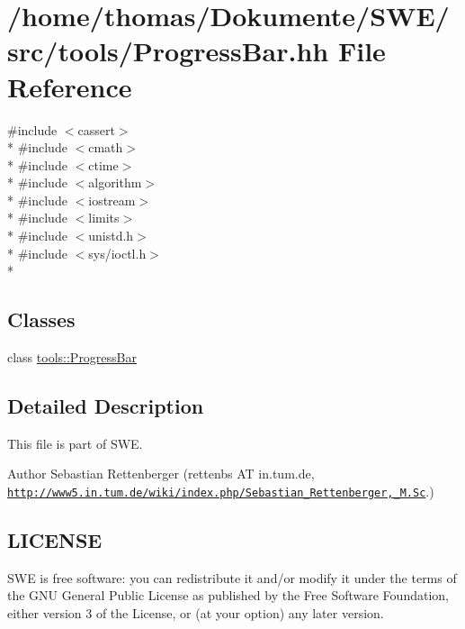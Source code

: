 \hypertarget{ProgressBar_8hh}{\section{/home/thomas/\-Dokumente/\-S\-W\-E/src/tools/\-Progress\-Bar.hh File Reference}
\label{ProgressBar_8hh}
}
{\ttfamily \#include $<$cassert$>$}\\*
{\ttfamily \#include $<$cmath$>$}\\*
{\ttfamily \#include $<$ctime$>$}\\*
{\ttfamily \#include $<$algorithm$>$}\\*
{\ttfamily \#include $<$iostream$>$}\\*
{\ttfamily \#include $<$limits$>$}\\*
{\ttfamily \#include $<$unistd.\-h$>$}\\*
{\ttfamily \#include $<$sys/ioctl.\-h$>$}\\*
\subsection*{Classes}
\begin{DoxyCompactItemize}
\item 
class \hyperlink{classtools_1_1ProgressBar}{tools\-::\-Progress\-Bar}
\end{DoxyCompactItemize}


\subsection{Detailed Description}
This file is part of S\-W\-E.

\begin{DoxyAuthor}{Author}
Sebastian Rettenberger (rettenbs A\-T in.\-tum.\-de, \href{http://www5.in.tum.de/wiki/index.php/Sebastian_Rettenberger,_M.Sc}{\tt http\-://www5.\-in.\-tum.\-de/wiki/index.\-php/\-Sebastian\-\_\-\-Rettenberger,\-\_\-\-M.\-Sc}.)
\end{DoxyAuthor}
\hypertarget{Writer_8hh_LICENSE}{}\subsection{L\-I\-C\-E\-N\-S\-E}\label{Writer_8hh_LICENSE}
S\-W\-E is free software\-: you can redistribute it and/or modify it under the terms of the G\-N\-U General Public License as published by the Free Software Foundation, either version 3 of the License, or (at your option) any later version.

